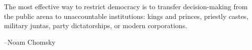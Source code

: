 \documentclass{exam}
\begin{document}
\else

\vspace{10 cm}

The most effective way to restrict democracy is to transfer decision-making from the public arena to unaccountable
institutions: kings and princes, priestly castes, military juntas, party dictatorships, or modern corporations.

\hspace{0.5 cm} 

--Noam Chomsky


\fi
\end{document}
